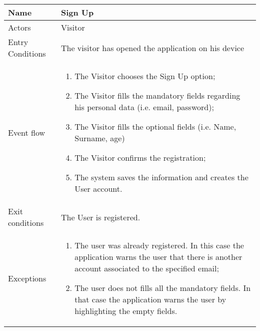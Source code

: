 \begin{table}[H]
  \centering
  \begin{tabularx}{\textwidth}{ |l|X| }
    \hline
    Name & Sign Up\\
    \hline
    Actors & Visitor\\
    \hline
    Entry Conditions & The visitor has opened the application on his device\\
    \hline
    Event flow & \begin{enumerate}[noitemsep]
                    \item The Visitor chooses the Sign Up option;
                    \item The Visitor fills the mandatory fields regarding his personal data (i.e. email, password);
                    \item The Visitor fills the optional fields (i.e. Name, Surname, age)
                    \item The Visitor confirms the registration;
                    \item The system saves the information and creates the User account.
                \end{enumerate}\\
    \hline
    Exit conditions & The User is registered.\\
    \hline
    Exceptions & \begin{enumerate}[noitemsep]
                  \item The user was already registered. In this case the application warns the user that there is another account associated to the specified email;
                  \item The user does not fills all the mandatory fields. In that case the application warns the user by highlighting the empty fields.
                \end{enumerate}\\
    \hline
  \end{tabularx}
\end{table}
